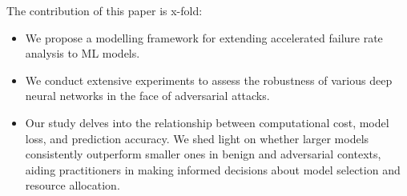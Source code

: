 The contribution of this paper is x-fold:
\begin{itemize}
    \item We propose a modelling framework for extending accelerated failure rate analysis to ML models.
    \item We conduct extensive experiments to assess the robustness of various deep neural networks in the face of adversarial attacks.
    \item Our study delves into the relationship between computational cost, model loss, and prediction accuracy. We shed light on whether larger models consistently outperform smaller ones in benign and adversarial contexts, aiding practitioners in making informed decisions about model selection and resource allocation.
\end{itemize}
